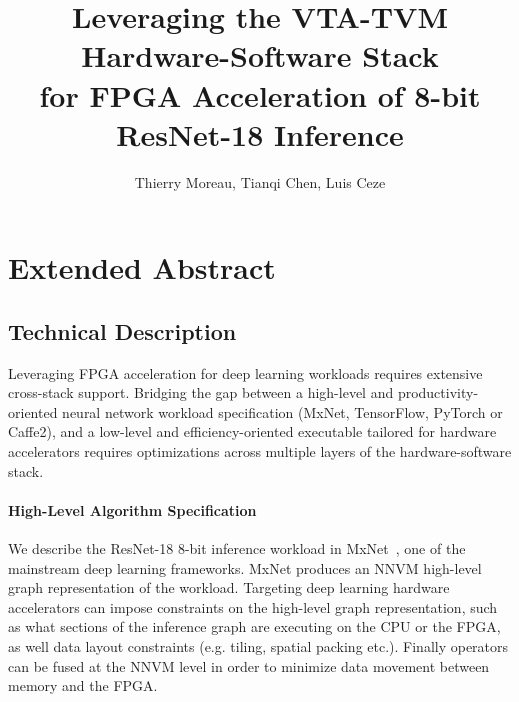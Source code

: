 \documentclass[sigconf]{acmart}
\begin{document}

\title{Leveraging the VTA-TVM Hardware-Software Stack \\for FPGA Acceleration of 8-bit ResNet-18 Inference}

\author{Thierry Moreau, Tianqi Chen, Luis Ceze}

\renewcommand{\shortauthors}{}
\renewcommand{\shorttitle}{}

\maketitle


\section{Extended Abstract}



\subsection{Technical Description}

Leveraging FPGA acceleration for deep learning workloads requires extensive cross-stack support.
Bridging the gap between a high-level and productivity-oriented neural network workload specification (MxNet, TensorFlow, PyTorch or Caffe2), and a low-level and efficiency-oriented executable tailored for hardware accelerators requires optimizations across multiple layers of the hardware-software stack.

\paragraph{High-Level Algorithm Specification}
We describe the ResNet-18 8-bit inference workload in MxNet~\cite{MXNet-whitepaper}, one of the mainstream deep learning frameworks.
MxNet produces an NNVM high-level graph representation of the workload.
Targeting deep learning hardware accelerators can impose constraints on the high-level graph representation, such as what sections of the inference graph are executing on the CPU or the FPGA, as well data layout constraints (e.g. tiling, spatial packing etc.).
Finally operators can be fused at the NNVM level in order to minimize data movement between memory and the FPGA.
\end{document}
